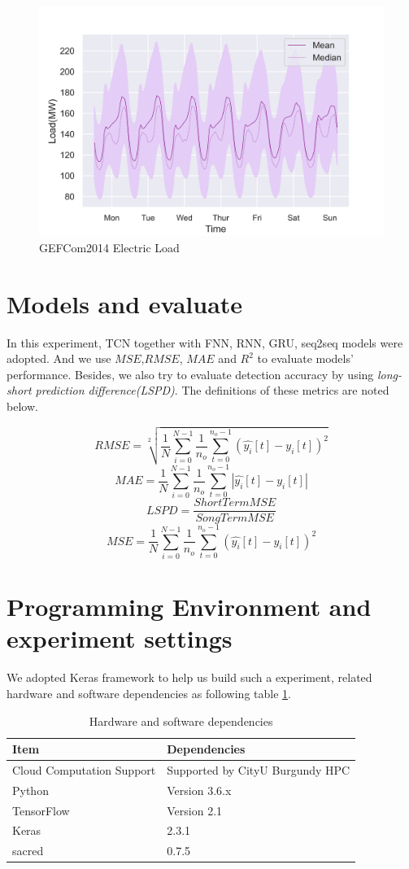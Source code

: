 \begin{figure}[H]
    \includegraphics[width=\textwidth]{../Figures/gef2014.PNG}
    \caption{GEFCom2014 Electric Load}
    \label{fig:gefc2014}
\end{figure}

\section{Models and evaluate}
In this experiment, TCN together with FNN, RNN, GRU, seq2seq models were adopted. And we use $MSE$,$RMSE$, $MAE$ and $R^2$ to evaluate models' performance. Besides, we also try to evaluate detection accuracy by using \textit{long-short prediction difference(LSPD)}. The definitions of these metrics are noted below.

$$RMSE = \sqrt[2]{\frac{1}{N}\sum_{i=0}^{N-1}\frac{1}{n_o}\sum_{t=0}^{n_o-1}(\hat{y_i}[t]-y_i[t])^2} $$
$$MAE = \frac{1}{N}\sum_{i=0}^{N-1}\frac{1}{n_o}\sum_{t=0}^{n_o-1}|\hat{y_i}[t]-y_i[t]|$$
$$LSPD = \frac{ShortTermMSE}{SongTermMSE}$$
$$MSE = \frac{1}{N}\sum_{i=0}^{N-1}\frac{1}{n_o}\sum_{t=0}^{n_o-1}(\hat{y_i}[t]-y_i[t])^2$$


\section{Programming Environment and experiment settings}
We adopted Keras framework to help us build such a experiment, related hardware and software dependencies as following table \ref{tab:dependencies}. 

\begin{table}[H]
\centering
\begin{tabular}{l l}
\toprule
\textbf{Item} & \textbf{Dependencies}  \\
\midrule
Cloud Computation Support & Supported by CityU Burgundy HPC\\
Python & Version 3.6.x  \\
TensorFlow& Version 2.1 \\
Keras& 2.3.1 \\
sacred& 0.7.5 \\
\bottomrule
\end{tabular}
\caption{Hardware and software dependencies}
\label{tab:dependencies}
\end{table}

